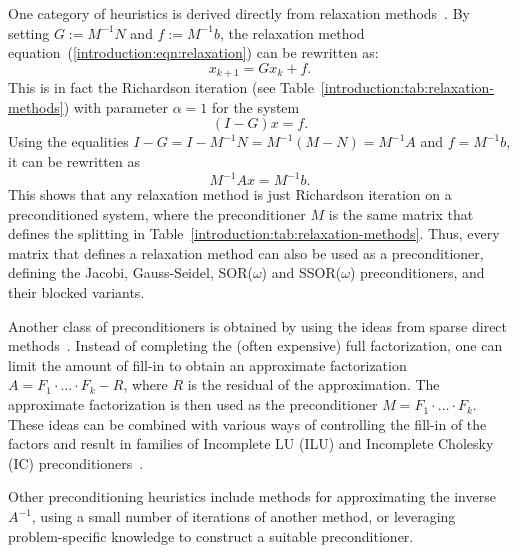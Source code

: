 One category of heuristics is derived directly from relaxation
methods~\cite{saad}. By setting $G := M^{-1}N$ and $f := M^{-1}b$, the
relaxation method equation~(\ref{introduction:eqn:relaxation}) can be rewritten
as:
\begin{equation}
    x_{k+1} = Gx_{k} + f.
\end{equation}
This is in fact the Richardson iteration (see
Table~\ref{introduction:tab:relaxation-methods}) with parameter $\alpha = 1$ for
the system
\begin{equation}
    (I - G)x = f.
\end{equation}
Using the equalities $I - G = I - M^{-1}N = M^{-1}(M - N) = M^{-1}A$ and $f =
M^{-1}b$, it can be rewritten as
\begin{equation}
    M^{-1}Ax = M^{-1}b.
\end{equation}
This shows that any relaxation method is just Richardson iteration on a
preconditioned system, where the preconditioner $M$ is the same matrix that
defines the splitting in Table~\ref{introduction:tab:relaxation-methods}. Thus,
every matrix that defines a relaxation method can also be used as a
preconditioner, defining the Jacobi, Gauss-Seidel, SOR($\omega$) and
SSOR($\omega$) preconditioners, and their blocked variants.

Another class of preconditioners is obtained by using the ideas from sparse
direct methods~\cite{saad}. Instead of completing the (often expensive) full
factorization, one can limit the amount of fill-in to obtain an approximate
factorization $A = F_1 \cdot \ldots \cdot F_k - R$, where $R$ is the residual of
the approximation. The approximate factorization is then used as the
preconditioner $M = F_1 \cdot \ldots \cdot F_k$. These ideas can be combined
with various ways of controlling the fill-in of the factors and result in
families of Incomplete LU (ILU) and Incomplete Cholesky (IC)
preconditioners~\cite{saad, parilut}.

Other preconditioning heuristics include methods for approximating the inverse
$A^{-1}$, using a small number of iterations of another method, or leveraging
problem-specific knowledge to construct a suitable preconditioner.
